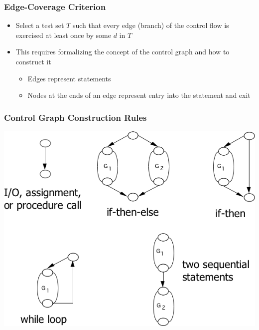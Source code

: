 \documentclass[t,12pt,numbers,fleqn]{beamer}
\begin{document}

\begin{frame}
\frametitle{Edge-Coverage Criterion}

\begin{itemize}
\item Select a test set $T$ such that every edge (branch) of the control flow is
  exercised at least once by some $d$ in $T$
\item This requires formalizing the concept of the control graph and how to construct it
\begin{itemize}
\item Edges represent statements
\item Nodes at the ends of an edge represent entry into the statement and exit
\end{itemize}
\end{itemize}

\end{frame}


\begin{frame}
\frametitle{Control Graph Construction Rules}

\includegraphics[scale=0.4]{../Figures/ControlGraphRules.png}

\end{frame}

\end{document}
